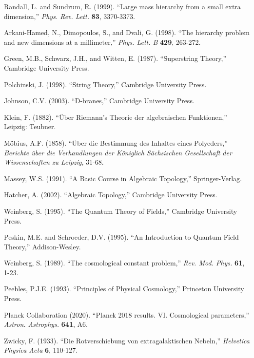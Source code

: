 \documentclass[12pt,a4paper]{article}
\begin{document}
\begin{thebibliography}{200}
Randall, L. and Sundrum, R. (1999). ``Large mass hierarchy from a small extra dimension,'' \textit{Phys. Rev. Lett.} \textbf{83}, 3370-3373.

Arkani-Hamed, N., Dimopoulos, S., and Dvali, G. (1998). ``The hierarchy problem and new dimensions at a millimeter,'' \textit{Phys. Lett. B} \textbf{429}, 263-272.

Green, M.B., Schwarz, J.H., and Witten, E. (1987). ``Superstring Theory,'' Cambridge University Press.

Polchinski, J. (1998). ``String Theory,'' Cambridge University Press.

Johnson, C.V. (2003). ``D-branes,'' Cambridge University Press.

Klein, F. (1882). ``Über Riemann's Theorie der algebraischen Funktionen,'' Leipzig: Teubner.

Möbius, A.F. (1858). ``Über die Bestimmung des Inhaltes eines Polyeders,'' \textit{Berichte über die Verhandlungen der Königlich Sächsischen Gesellschaft der Wissenschaften zu Leipzig}, 31-68.

Massey, W.S. (1991). ``A Basic Course in Algebraic Topology,'' Springer-Verlag.

Hatcher, A. (2002). ``Algebraic Topology,'' Cambridge University Press.

Weinberg, S. (1995). ``The Quantum Theory of Fields,'' Cambridge University Press.

Peskin, M.E. and Schroeder, D.V. (1995). ``An Introduction to Quantum Field Theory,'' Addison-Wesley.

Weinberg, S. (1989). ``The cosmological constant problem,'' \textit{Rev. Mod. Phys.} \textbf{61}, 1-23.

Peebles, P.J.E. (1993). ``Principles of Physical Cosmology,'' Princeton University Press.

Planck Collaboration (2020). ``Planck 2018 results. VI. Cosmological parameters,'' \textit{Astron. Astrophys.} \textbf{641}, A6.

Zwicky, F. (1933). ``Die Rotverschiebung von extragalaktischen Nebeln,'' \textit{Helvetica Physica Acta} \textbf{6}, 110-127.


\end{thebibliography}
\end{document}
